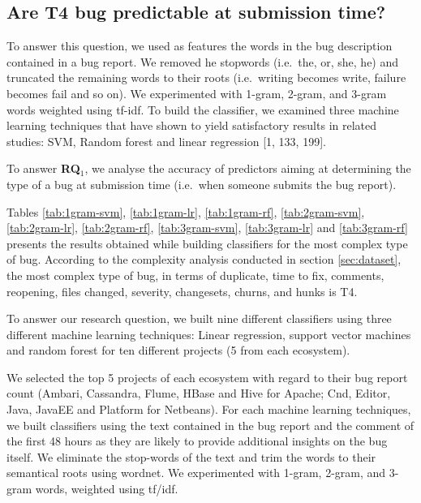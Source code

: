 \documentclass[12pt]{report}
\begin{document}
\subsection{Are T4 bug predictable at submission
time?}\label{are-t4-bug-predictable-at-submission-time}

To answer this question, we used as features the words in the bug
description contained in a bug report. We removed he stopwords
(i.e.~the, or, she, he) and truncated the remaining words to their roots
(i.e.~writing becomes write, failure becomes fail and so on). We
experimented with 1-gram, 2-gram, and 3-gram words weighted using
tf-idf. To build the classifier, we examined three machine learning
techniques that have shown to yield satisfactory results in related
studies: SVM, Random forest and linear regression {[}1, 133, 199{]}.

To answer \textbf{RQ\(_1\)}, we analyse the accuracy of predictors
aiming at determining the type of a bug at submission time (i.e.~when
someone submits the bug report).

Tables \ref{tab:1gram-svm}, \ref{tab:1gram-lr}, \ref{tab:1gram-rf},
\ref{tab:2gram-svm}, \ref{tab:2gram-lr}, \ref{tab:2gram-rf},
\ref{tab:3gram-svm}, \ref{tab:3gram-lr} and \ref{tab:3gram-rf} presents
the results obtained while building classifiers for the most complex
type of bug. According to the complexity analysis conducted in section
\ref{sec:dataset}, the most complex type of bug, in terms of duplicate,
time to fix, comments, reopening, files changed, severity, changesets,
churns, and hunks is T4.

To answer our research question, we built nine different classifiers
using three different machine learning techniques: Linear regression,
support vector machines and random forest for ten different projects (5
from each ecosystem).

We selected the top 5 projects of each ecosystem with regard to their
bug report count (Ambari, Cassandra, Flume, HBase and Hive for Apache;
Cnd, Editor, Java, JavaEE and Platform for Netbeans). For each machine
learning techniques, we built classifiers using the text contained in
the bug report and the comment of the first 48 hours as they are likely
to provide additional insights on the bug itself. We eliminate the
stop-words of the text and trim the words to their semantical roots
using wordnet. We experimented with 1-gram, 2-gram, and 3-gram words,
weighted using tf/idf.
\end{document}
